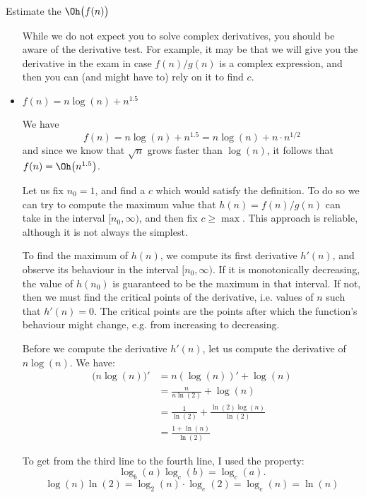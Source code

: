 \documentclass{practice}
\begin{document}
\begin{task}{Estimate the $\Oh\bigl(f(n)\bigr)$}
\begin{itemize}
    \begin{tcolorbox}[title=Derivative test]
      While we do not expect you to solve complex derivatives, you should be aware of the derivative test.
      For example, it may be that we will give you the derivative in the exam in case $f(n)/g(n)$ is a complex expression, and then you can (and might have to) rely on it to find $c$.
    \end{tcolorbox}

    \iffalse
    Now we must check whether $h'(n)$ is negative for $n=n_0=10$.
    Since $20\ln(2) > 11$, we have that $h'(10)<0$.
    Because $h'(n)_{n>1}$ is also monotonically decreasing, it will remain negative for all values of $n > n_0$.
    This means that $h(n)$ is decreasing for all values of $n > n_0$, and that $h(n)$ takes its maximum value for $n\in[n_0, \infty)$ at $n_0$.

    We have $h(n_0) = f(10)/g(10) = (110 + 20 + 1024)/1024 = 1154/1024 \approx 1.13$.
    Thus $n_0 = 10$ and $c \ge 2$ will satisfy the definition.
    \fi

    \item $f(n) = n \log(n) + n^{1.5}$
    
    We have
    \[
      f(n) = n\log(n) + n^{1.5} = n \log(n) + n \cdot n^{1/2}
    \]
    and since we know that $\sqrt{n}$ grows faster than $\log(n)$, it follows that $f(n)=\Oh\bigl(n^{1.5}\bigr)$.

    Let us fix $n_0 = 1$, and find a $c$ which would satisfy the definition.
    To do so we can try to compute the maximum value that $h(n)=f(n)/g(n)$ can take in the interval $[n_0, \infty)$, and then fix $c \ge \max$.
    This approach is reliable, although it is not always the simplest.

    To find the maximum of $h(n)$, we compute its first derivative $h'(n)$, and observe its behaviour in the interval $[n_0, \infty)$.
    If it is monotonically decreasing, the value of $h(n_0)$ is guaranteed to be the maximum in that interval.
    If not, then we must find the critical points of the derivative, i.e. values of $n$ such that $h'(n)=0$.
    The critical points are the points after which the function's behaviour might change, e.g. from increasing to decreasing.

    Before we compute the derivative $h'(n)$, let us compute the derivative of $n\log(n)$.
    We have:
    \begin{align*}
      \bigl(n\log(n)\bigr)' &= n(\log(n))' + \log(n)\\
      &= \frac{n}{n \ln(2)} + \log(n)\\
      &= \frac{1}{\ln(2)} + \frac{\ln(2)\log(n)}{\ln(2)}\\
      &= \frac{1+\ln(n)}{\ln(2)}
    \end{align*}
    \begin{tcolorbox}[title=Log base switch]
      To get from the third line to the fourth line, I used the property:
      \[
        \log_b(a)\log_c(b) = \log_c(a).
      \]
      \tcblower
      \[
        \log(n)\ln(2) = \log_2(n) \cdot \log_e(2) = \log_e(n) = \ln(n)
      \]
    \end{tcolorbox}


\end{itemize}
\end{task}
\end{document}
